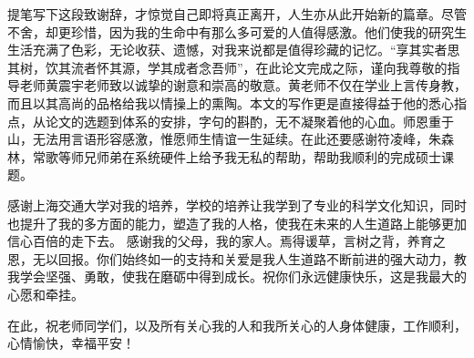 \begin{thanks}

提笔写下这段致谢辞，才惊觉自己即将真正离开，人生亦从此开始新的篇章。尽管不舍，却更珍惜，因为我的生命中有那么多可爱的人值得感激。他们使我的研究生生活充满了色彩，无论收获、遗憾，对我来说都是值得珍藏的记忆。“享其实者思其树，饮其流者怀其源，学其成者念吾师”，在此论文完成之际，谨向我尊敬的指导老师黄震宇老师致以诚挚的谢意和崇高的敬意。黄老师不仅在学业上言传身教，而且以其高尚的品格给我以情操上的熏陶。本文的写作更是直接得益于他的悉心指点，从论文的选题到体系的安排，字句的斟酌，无不凝聚着他的心血。师恩重于山，无法用言语形容感激，惟愿师生情谊一生延续。在此还要感谢符凌峰，朱森林，常歌等师兄师弟在系统硬件上给予我无私的帮助，帮助我顺利的完成硕士课题。

感谢上海交通大学对我的培养，学校的培养让我学到了专业的科学文化知识，同时也提升了我的多方面的能力，塑造了我的人格，使我在未来的人生道路上能够更加信心百倍的走下去。
感谢我的父母，我的家人。焉得谖草，言树之背，养育之恩，无以回报。你们始终如一的支持和关爱是我人生道路不断前进的强大动力，教我学会坚强、勇敢，使我在磨砺中得到成长。祝你们永远健康快乐，这是我最大的心愿和牵挂。

在此，祝老师同学们，以及所有关心我的人和我所关心的人身体健康，工作顺利，心情愉快，幸福平安！
\end{thanks}
